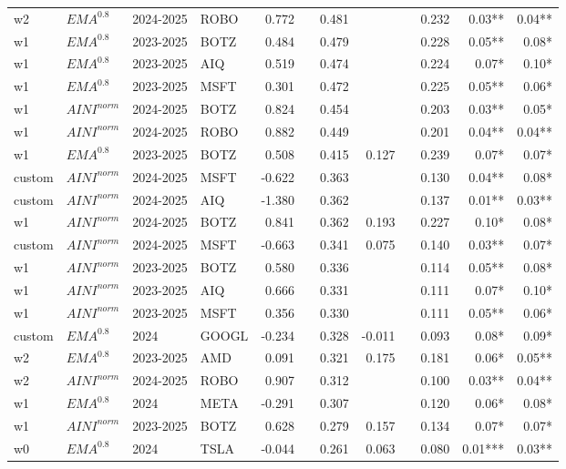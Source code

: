 {\begin{tabularx}{\textwidth}{@{}X@{\hspace{0.5pt}}X@{\hspace{0.5pt}}X@{\hspace{0.5pt}}X@{\hspace{2.0pt}} r r r r r r r r@{}}
w2 & $EMA^{0.8}$ & 2024-2025 & ROBO & 0.772 &  & 0.481 &  &  & 0.232 & 0.03** & 0.04** \\
w1 & $EMA^{0.8}$ & 2023-2025 & BOTZ & 0.484 &  & 0.479 &  &  & 0.228 & 0.05** & 0.08* \\
w1 & $EMA^{0.8}$ & 2023-2025 & AIQ & 0.519 &  & 0.474 &  &  & 0.224 & 0.07* & 0.10* \\
w1 & $EMA^{0.8}$ & 2023-2025 & MSFT & 0.301 &  & 0.472 &  &  & 0.225 & 0.05** & 0.06* \\
w1 & $AINI^{norm}$ & 2024-2025 & BOTZ & 0.824 &  & 0.454 &  &  & 0.203 & 0.03** & 0.05* \\
w1 & $AINI^{norm}$ & 2024-2025 & ROBO & 0.882 &  & 0.449 &  &  & 0.201 & 0.04** & 0.04** \\
w1 & $EMA^{0.8}$ & 2023-2025 & BOTZ & 0.508 &  & 0.415 & 0.127 &  & 0.239 & 0.07* & 0.07* \\
custom & $AINI^{norm}$ & 2024-2025 & MSFT & -0.622 &  & 0.363 &  &  & 0.130 & 0.04** & 0.08* \\
custom & $AINI^{norm}$ & 2024-2025 & AIQ & -1.380 &  & 0.362 &  &  & 0.137 & 0.01** & 0.03** \\
w1 & $AINI^{norm}$ & 2024-2025 & BOTZ & 0.841 &  & 0.362 & 0.193 &  & 0.227 & 0.10* & 0.08* \\
custom & $AINI^{norm}$ & 2024-2025 & MSFT & -0.663 &  & 0.341 & 0.075 &  & 0.140 & 0.03** & 0.07* \\
w1 & $AINI^{norm}$ & 2023-2025 & BOTZ & 0.580 &  & 0.336 &  &  & 0.114 & 0.05** & 0.08* \\
w1 & $AINI^{norm}$ & 2023-2025 & AIQ & 0.666 &  & 0.331 &  &  & 0.111 & 0.07* & 0.10* \\
w1 & $AINI^{norm}$ & 2023-2025 & MSFT & 0.356 &  & 0.330 &  &  & 0.111 & 0.05** & 0.06* \\
custom & $EMA^{0.8}$ & 2024 & GOOGL & -0.234 &  & 0.328 & -0.011 &  & 0.093 & 0.08* & 0.09* \\
w2 & $EMA^{0.8}$ & 2023-2025 & AMD & 0.091 &  & 0.321 & 0.175 &  & 0.181 & 0.06* & 0.05** \\
w2 & $AINI^{norm}$ & 2024-2025 & ROBO & 0.907 &  & 0.312 &  &  & 0.100 & 0.03** & 0.04** \\
w1 & $EMA^{0.8}$ & 2024 & META & -0.291 &  & 0.307 &  &  & 0.120 & 0.06* & 0.08* \\
w1 & $AINI^{norm}$ & 2023-2025 & BOTZ & 0.628 &  & 0.279 & 0.157 &  & 0.134 & 0.07* & 0.07* \\
w0 & $EMA^{0.8}$ & 2024 & TSLA & -0.044 &  & 0.261 & 0.063 &  & 0.080 & 0.01*** & 0.03** \\

\end{tabularx}}
